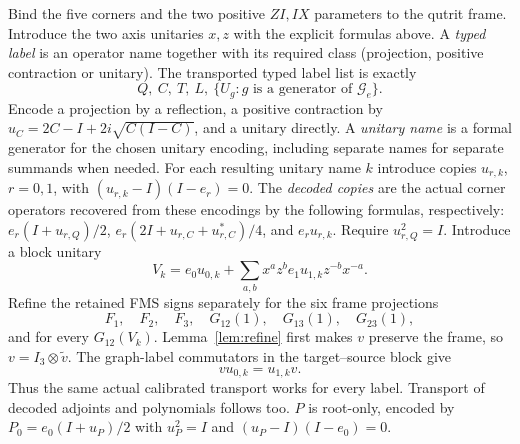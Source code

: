 Bind the five corners and the two positive $ZI,IX$ parameters to the
qutrit frame. Introduce the two axis unitaries $x,z$ with the explicit
formulas above. A \emph{typed label} is an operator name together with its required
class (projection, positive contraction or unitary).
The transported typed label list is exactly
\begin{equation}\label{eq:labels}
 Q,\ C,\ T,\ L,\ \{U_g:g\text{ is a generator of }\mathcal G_e\}.
\end{equation}
Encode a projection by a reflection, a positive contraction by
$u_C=2C-I+2i\sqrt{C(I-C)}$, and a unitary directly.
A \emph{unitary name} is a formal generator for the chosen unitary
encoding, including separate names for separate summands when needed.
For each resulting unitary name $k$ introduce copies $u_{r,k}$,
$r=0,1$, with $(u_{r,k}-I)(I-e_r)=0$.
The \emph{decoded copies} are the actual corner operators recovered
from these encodings by the following formulas, respectively:
$e_r(I+u_{r,Q})/2$,
$e_r(2I+u_{r,C}+u_{r,C}^*)/4$, and $e_ru_{r,k}$.
Require $u_{r,Q}^2=I$.
Introduce a block unitary
\[
 V_k=e_0u_{0,k}+
 \sum_{a,b}x^az^b e_1u_{1,k}z^{-b}x^{-a}.
\]
Refine the retained FMS signs separately for the six frame projections
\[
 F_1,\quad F_2,\quad F_3,\quad G_{12}(1),\quad G_{13}(1),\quad G_{23}(1),
\]
and for every $G_{12}(V_k)$.
Lemma~\ref{lem:refine} first makes $v$ preserve the
frame, so $v=I_3\otimes\widetilde v$.
The graph-label commutators in the target--source block give
\begin{equation}\label{eq:transport}
 vu_{0,k}=u_{1,k}v.
\end{equation}
Thus the same actual calibrated transport works for every label.
Transport of decoded adjoints and polynomials follows too.
$P$ is root-only, encoded by $P_0=e_0(I+u_P)/2$ with
$u_P^2=I$ and $(u_P-I)(I-e_0)=0$.

